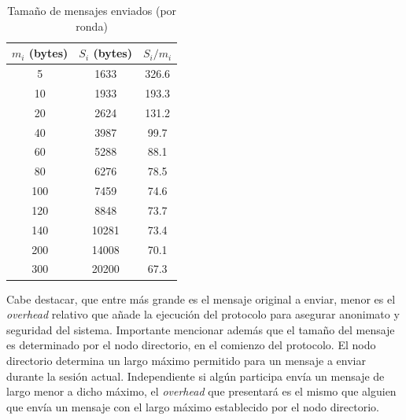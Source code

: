 \begin{table}[h!]
\centering
\begin{tabular}[h!]{|c|c|c|}
\hline
$m_i$ (bytes) & $S_i$ (bytes) & $S_i / m_i$ \\ \hline
5                                   & 1633                               & 326.6       \\ \hline
10                                  & 1933                               & 193.3       \\ \hline
20                                  & 2624                               & 131.2       \\ \hline
40                                  & 3987                               & 99.7        \\ \hline
60                                  & 5288                               & 88.1        \\ \hline
80                                  & 6276                               & 78.5        \\ \hline
100                                 & 7459                               & 74.6        \\ \hline
120                                 & 8848                               & 73.7        \\ \hline
140                                 & 10281                              & 73.4        \\ \hline
200                                 & 14008                              & 70.1        \\ \hline
300                                 & 20200                              & 67.3        \\ \hline
\end{tabular}
\caption{Tamaño de mensajes enviados (por ronda)}
\label{table:message_sizes_table}
\end{table}

Cabe destacar, que entre más grande es el mensaje original a enviar, menor es 
el \emph{overhead} relativo que añade la ejecución del protocolo para asegurar 
anonimato y seguridad del sistema. Importante mencionar además que el tamaño 
del mensaje es determinado por el nodo directorio, en el comienzo del protocolo. 
El nodo directorio determina un largo máximo permitido para un mensaje a enviar 
durante la sesión actual. Independiente si algún participa envía un mensaje de largo menor a dicho 
máximo, el \emph{overhead} que presentará es el mismo que alguien que envía un 
mensaje con el largo máximo establecido por el nodo directorio.
